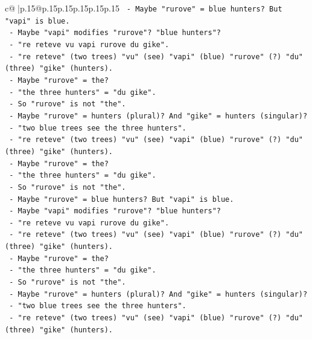 \documentclass{article}
\begin{document}
{\begin{supertabular}{c@{$\;$}|p{.15\linewidth}@{}p{.15\linewidth}p{.15\linewidth}p{.15\linewidth}p{.15\linewidth}p{.15\linewidth}}
{{{\texttt{           {-} Maybe "rurove" = blue hunters? But "vapi" is blue.} \\
\texttt{           {-} Maybe "vapi" modifies "rurove"? "blue hunters"?} \\
\texttt{           {-} "re reteve vu vapi rurove du gike".} \\
\texttt{           {-} "re reteve" (two trees) "vu" (see) "vapi" (blue) "rurove" (?) "du" (three) "gike" (hunters).} \\
\texttt{           {-} Maybe "rurove" = the?} \\
\texttt{           {-} "the three hunters" = "du gike".} \\
\texttt{           {-} So "rurove" is not "the".} \\
\texttt{           {-} Maybe "rurove" = hunters (plural)? And "gike" = hunters (singular)?} \\
\texttt{           {-} "two blue trees see the three hunters".} \\
\texttt{           {-} "re reteve" (two trees) "vu" (see) "vapi" (blue) "rurove" (?) "du" (three) "gike" (hunters).} \\
\texttt{           {-} Maybe "rurove" = the?} \\
\texttt{           {-} "the three hunters" = "du gike".} \\
\texttt{           {-} So "rurove" is not "the".} \\
\texttt{           {-} Maybe "rurove" = blue hunters? But "vapi" is blue.} \\
\texttt{           {-} Maybe "vapi" modifies "rurove"? "blue hunters"?} \\
\texttt{           {-} "re reteve vu vapi rurove du gike".} \\
\texttt{           {-} "re reteve" (two trees) "vu" (see) "vapi" (blue) "rurove" (?) "du" (three) "gike" (hunters).} \\
\texttt{           {-} Maybe "rurove" = the?} \\
\texttt{           {-} "the three hunters" = "du gike".} \\
\texttt{           {-} So "rurove" is not "the".} \\
\texttt{           {-} Maybe "rurove" = hunters (plural)? And "gike" = hunters (singular)?} \\
\texttt{           {-} "two blue trees see the three hunters".} \\
\texttt{           {-} "re reteve" (two trees) "vu" (see) "vapi" (blue) "rurove" (?) "du" (three) "gike" (hunters).} \\
}}}
\end{supertabular}}
\end{document}
